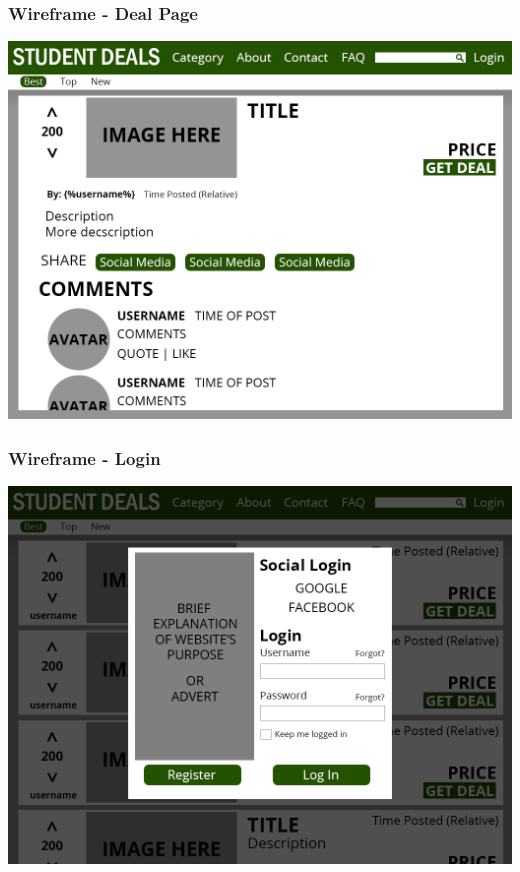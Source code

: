 \documentclass{beamer}
\begin{document}
\begin{frame}
	\frametitle{Wireframe - Deal Page}
	\includegraphics[width=\textwidth,height=\textheight,keepaspectratio]{mockups/deal-page}
\end{frame}

\begin{frame}
	\frametitle{Wireframe - Login}
	\includegraphics[width=\textwidth,height=\textheight,keepaspectratio]{mockups/login}
\end{frame}
	
\end{document}
